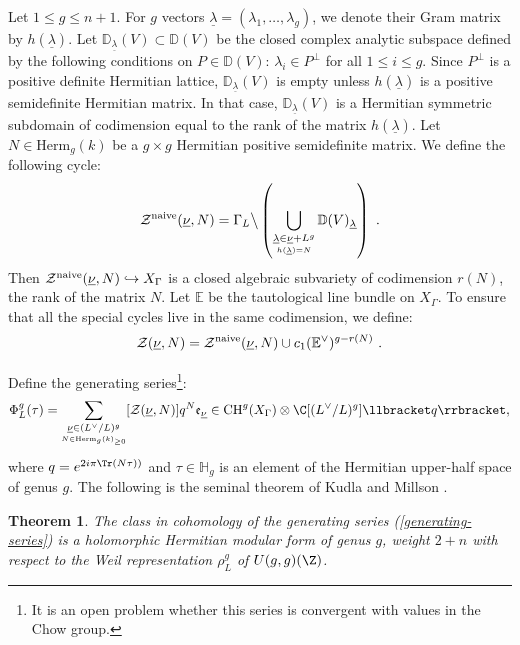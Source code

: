 \documentclass[11pt,letterpaper,english]{amsart}
\numberwithin{equation}{subsection}
\numberwithin{equation}{section}
\newcommand\cZ{{\mathcal Z}}
\theoremstyle{plain}
\newtheorem{theorem}{Theorem}[section]
\theoremstyle{remark}
\begin{document}
Let $1\leq g\leq n+1$. For $g$ vectors $\underline{\lambda}=(\lambda_1,\ldots,\lambda_g)$, we denote their Gram matrix by $h(\underline{\lambda})$. Let $\mathbb D_{\underline{\lambda}}(V)\subset \mathbb D(V)$ be the closed complex analytic subspace defined by the following conditions on $P\in \mathbb D(V)$: $\lambda_i\in P^{\bot}$ for all $1\leq i\leq g$. Since $P^{\bot}$ is a positive definite Hermitian lattice, $\mathbb D_{\underline{\lambda}}(V)$ is empty unless $h(\underline{\lambda})$ is a positive semidefinite Hermitian matrix. In that case, $\mathbb D_{\underline{\lambda}}(V)$ is a Hermitian symmetric subdomain of codimension equal to the rank of the matrix  $h(\underline \lambda)$.
Let $N\in \mathrm{Herm}_{g}(k)$ be a $g\times g$ Hermitian positive semidefinite matrix. We define the following cycle: 
\[\cZ^{\rm naive}(\underline{\nu},N)=\Gamma_L\big\backslash\left(\bigcup_{\underset{h(\underline \lambda)=N}{\underline{\lambda}\in \underline{\nu}+L^g}}\mathbb D(V)_{\underline{\lambda}}\right)~.\]
Then $\cZ^{\rm naive}(\underline{\nu},N)\hookrightarrow X_{\Gamma}$ is a closed algebraic subvariety of codimension $r(N)$, the rank of the matrix $N$. Let $\mathbb{E}$ be the tautological line bundle on $X_\Gamma$. To ensure that all the special cycles live in the same codimension, we define: \[\cZ(\underline{\nu},N)=\cZ^{\rm naive}(\underline{\nu},N)\cup c_1(\mathbb{E}^\vee)^{g-r(N)}~.\] 


Define the generating series\footnote{It is an open problem whether this series is convergent with values in the Chow group.}: 
\begin{align}\label{generating-series}
  \Phi^g_L(\tau)=  \sum_{\underset{N\in\mathrm{Herm}_{g}(k)_{\geq 0}}{\underline{\nu}\in (L^\vee/L)^g}} [\cZ(\underline{\nu},N)]q^{N}\mathfrak e_{\underline\nu}\in \mathrm{CH}^g(X_\Gamma)\otimes\C[(L^\vee/L)^g] \llbracket q \rrbracket,
\end{align}
where $q=e^{2i\pi \Tr(N\tau))}$ and $\tau\in\mathbb{H}_g$ is an element of the Hermitian upper-half space of genus $g$. The following is the seminal theorem of Kudla and Millson \cite{kudla-millson}. 

\begin{theorem}
    The class in cohomology of the generating series (\ref{generating-series}) is a holomorphic Hermitian modular form of genus $g$, weight $2+n$ with respect to the Weil representation $\rho_L^g$ of $U(g,g)(\Z)$. 
\end{theorem}
    
\end{document}
